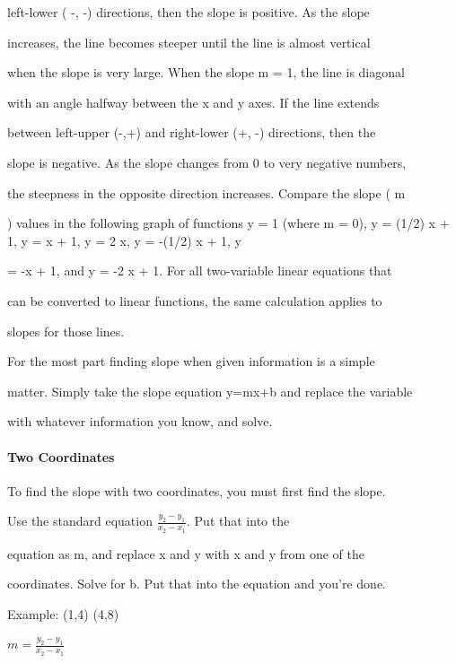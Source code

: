 left-lower ( -, -) directions, then the slope is positive. As the slope

increases, the line becomes steeper until the line is almost vertical

when the slope is very large. When the slope m = 1, the line is diagonal

with an angle halfway between the x and y axes. If the line extends

between left-upper (-,+) and right-lower (+, -) directions, then the

slope is negative. As the slope changes from 0 to very negative numbers,

the steepness in the opposite direction increases. Compare the slope ( m

) values in the following graph of functions y = 1 (where m = 0), y = (1/2) x + 1, y = x + 1, y = 2 x, y = -(1/2) x + 1, y

= -x + 1, and y = -2 x + 1. For all two-variable linear equations that

can be converted to linear functions, the same calculation applies to

slopes for those lines.






For the most part finding slope when given information is a simple

matter. Simply take the slope equation y=mx+b and replace the variable

with whatever information you know, and solve.



\paragraph{Two Coordinates}



To find the slope with two coordinates, you must first find the slope.

Use the standard equation $\frac{y_2-y_1}{x_2-x_1}$. Put that into the

equation as m, and replace x and y with x and y from one of the

coordinates. Solve for b. Put that into the equation and you're done.



Example: (1,4) (4,8)



$m = \frac{y_2-y_1}{x_2-x_1}$



